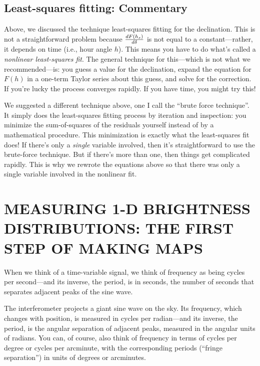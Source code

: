 \documentclass[11pt,preprint]{aastex}
\begin{document}
\subsection {Least-squares fitting: Commentary} 

	Above, we discussed the technique least-squares fitting for the
declination.  This is not a straightforward problem because ${dF(h_s)
\over d\delta}$ is not equal to a constant---rather, it depends on time
(i.e., hour angle $h$).  This means you have to do what's called a {\it
nonlinear least-squares fit}.  The general technique for this---which is
not what we recommended---is: you guess a value for the declination,
expand the equation for $F(h)$ in a one-term Taylor series about this
guess, and solve for the correction.  If you're lucky the process
converges rapidly.  If you have time, you might try this!

	We suggested a different technique above, one I call the ``brute
force technique''.  It simply does the least-squares fitting process by
iteration and inspection: you minimize the sum-of-squares of the
residuals yourself instead of by a mathematical procedure.  This
minimization is exactly what the least-squares fit does! If there's only
a {\it single} variable involved, then it's straightforward to use the
brute-force technique.  But if there's more than one, then things get
complicated rapidly.  This is why we rewrote the equations above so that
there was only a single variable involved in the nonlinear fit. 

\section{MEASURING 1-D BRIGHTNESS DISTRIBUTIONS: THE FIRST STEP OF
MAKING MAPS} \label{mun}

	When we think of a time-variable signal, we think of frequency
as being cycles per second---and its inverse, the period, is in seconds,
the number of seconds that separates adjacent peaks of the sine wave. 

	The interferometer projects a giant sine wave on the sky. Its
frequency, which changes with position, is measured in cycles per
radian---and its inverse, the period, is the angular separation of
adjacent peaks, measured in the angular units of radians. You can, of
course, also think of frequency in terms of cycles per degree or cycles
per arcminute, with the corresponding periods (``fringe separation'') in
units of degrees or arcminutes. 
\end{document}
